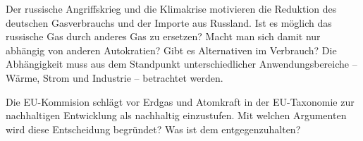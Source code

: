 
Der russische Angriffskrieg und die Klimakrise motivieren die Reduktion des deutschen Gasverbrauchs und der Importe aus Russland. Ist es möglich das russische Gas durch anderes Gas zu ersetzen? Macht man sich damit nur abhängig von anderen Autokratien? Gibt es Alternativen im Verbrauch? Die Abhängigkeit muss aus dem Standpunkt unterschiedlicher Anwendungsbereiche -- Wärme, Strom und Industrie -- betrachtet werden. 

Die EU-Kommision schlägt vor Erdgas und Atomkraft in der EU-Taxonomie zur nachhaltigen Entwicklung als nachhaltig einzustufen. Mit welchen Argumenten wird diese Entscheidung begründet? Was ist dem entgegenzuhalten?